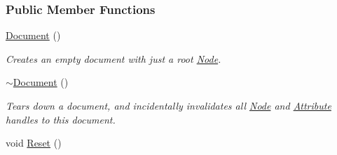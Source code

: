 \subsubsection*{Public Member Functions}
\begin{DoxyCompactItemize}
\item 
\hypertarget{classphys_1_1xml_1_1Document_ae1e779f0826bf3357ff77846155aad7d}{
\hyperlink{classphys_1_1xml_1_1Document_ae1e779f0826bf3357ff77846155aad7d}{Document} ()}
\label{dd/d44/classphys_1_1xml_1_1Document_ae1e779f0826bf3357ff77846155aad7d}

\begin{DoxyCompactList}\small\item\em Creates an empty document with just a root \hyperlink{classphys_1_1xml_1_1Node}{Node}. \item\end{DoxyCompactList}\item 
\hypertarget{classphys_1_1xml_1_1Document_a70013c2b670c4d4b5ee55d12e7c50be4}{
\hyperlink{classphys_1_1xml_1_1Document_a70013c2b670c4d4b5ee55d12e7c50be4}{$\sim$Document} ()}
\label{dd/d44/classphys_1_1xml_1_1Document_a70013c2b670c4d4b5ee55d12e7c50be4}

\begin{DoxyCompactList}\small\item\em Tears down a document, and incidentally invalidates all \hyperlink{classphys_1_1xml_1_1Node}{Node} and \hyperlink{classphys_1_1xml_1_1Attribute}{Attribute} handles to this document. \item\end{DoxyCompactList}\item 
\hypertarget{classphys_1_1xml_1_1Document_a9ab556271e4a1214ecb35ba6aef9e8e4}{
void \hyperlink{classphys_1_1xml_1_1Document_a9ab556271e4a1214ecb35ba6aef9e8e4}{Reset} ()}
\label{dd/d44/classphys_1_1xml_1_1Document_a9ab556271e4a1214ecb35ba6aef9e8e4}


\end{DoxyCompactItemize}
